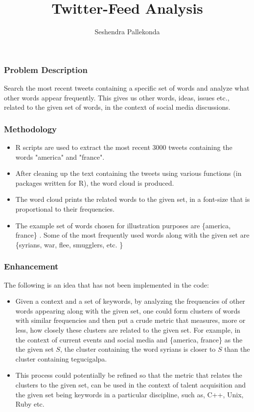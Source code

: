 \documentclass{beamer}
\title{Twitter-Feed Analysis}
\author{Seshendra Pallekonda}
\begin{document}
\begin{frame}
\frametitle{Problem Description}
Search the most recent tweets containing a specific set of words and analyze what other words appear frequently. This gives us other words, ideas, issues etc., related to the given set of words, in the context of social media discussions.
\end{frame}

\begin{frame}
\frametitle{Methodology}

\begin{itemize}
\item R scripts are used to extract the most recent 3000 tweets containing the words "america" and "france".  
\item After cleaning up the text containing the tweets using various functions (in packages written for R), the word cloud is produced.
\item The word cloud prints the related words to the given set, in a font-size that is proportional to their frequencies.
\item The example set of words chosen for illustration purposes are \{america, france\} . Some of the most frequently used words along with the given set are \{syrians, war, flee, smugglers, etc. \}

\end{itemize}
\end{frame}

\begin{frame}
\frametitle{Enhancement}
The following is an idea that has not been implemented in the code:

\begin{itemize}

\item Given a context and a set of keywords, by analyzing the frequencies of other words appearing along with the given set, one could form clusters of words with similar frequencies and then put a crude metric that measures, more or less, how closely these clusters are related to the given set.
For example, in the context of current events and social media and \{america, france\} as the the given set $S$, the cluster containing the word syrians is closer to $S$ than the cluster containing tegucigalpa.

\item This process could potentially be refined so that the metric that relates the clusters to the given set, can be used in the context of talent acquisition and the given set being keywords in a particular discipline, such as, C++, Unix, Ruby etc.

\end{itemize}
\end{frame}
\end{document}
